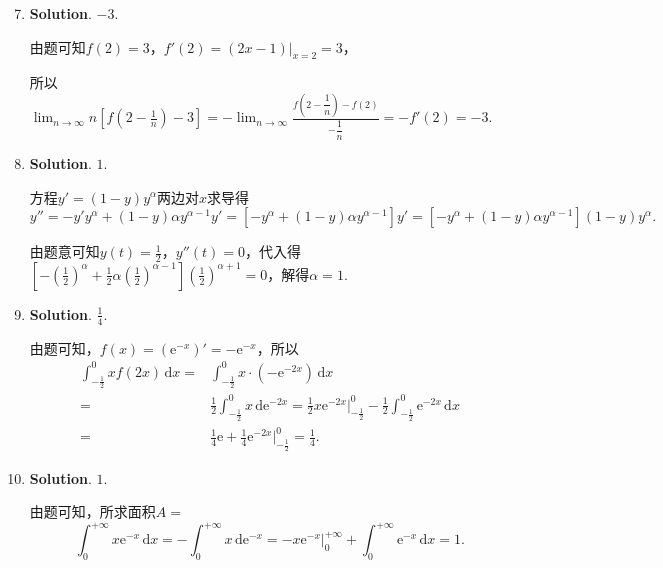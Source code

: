 \documentclass[../Main.tex]{subfiles}
\begin{document}
\begin{enumerate}
    \setcounter{enumi}{6}
    \item \textbf{Solution}. $-3$.

          由题可知$f(2)=3$，$f'(2)=(2x-1)\bigg|_{x=2}=3$，

          所以$\lim_{n\to\infty}n\left[f\left(2-\frac{1}{n}\right)-3\right] = -\lim_{n\to\infty}
              \frac{f\left(2-\dfrac{1}{n}\right)-f(2)}{-\dfrac{1}{n}}= -f'(2) = -3$.

    \item \textbf{Solution}. $1$.

          方程$y'=(1-y)y^{\alpha}$两边对$x$求导得
          \[
              y''=-y'y^{\alpha}+(1-y)\alpha y^{\alpha-1}y'=\left[-y^{\alpha}+(1-y)\alpha
                  y^{\alpha-1}\right]y'=\left[-y^{\alpha}+(1-y)\alpha y^{\alpha-1}\right](1
              -y)y^{\alpha}.
          \]

          由题意可知$y(t)=\frac{1}{2}$，$y''(t)=0$，代入得$\left[-\left(\frac{1}{2}\right
                  )^{\alpha}+\frac{1}{2}\alpha \left(\frac{1}{2}\right)^{\alpha-1}\right]\left
              (\frac{1}{2}\right)^{\alpha+1}=0$，解得$\alpha=1$.

    \item \textbf{Solution}. $\frac{1}{4}$.

          由题可知，$f(x)=\left(\mathrm{e}^{-x}\right)'=-\mathrm{e}^{-x}$，所以
          \[
              \begin{aligned}
                  \int_{-\frac{1}{2}}^{0}xf(2x)\,\mathrm{d}x = & \int_{-\frac{1}{2}}^{0}x\cdot\left(-\mathrm{e}^{-2x}\right)\,\mathrm{d}x                                                                                                               \\
                  =                                            & \frac{1}{2}\int_{-\frac{1}{2}}^{0}x\,\mathrm{d}\mathrm{e}^{-2x}= \frac{1}{2}x\mathrm{e}^{-2x}\bigg|_{-\frac{1}{2}}^{0}-\frac{1}{2}\int_{-\frac{1}{2}}^{0}\mathrm{e}^{-2x}\,\mathrm{d}x \\
                  =                                            & \frac{1}{4}\mathrm{e}+\frac{1}{4}\mathrm{e}^{-2x}\bigg|_{-\frac{1}{2}}^{0}= \frac{1}{4}.
              \end{aligned}
          \]

    \item \textbf{Solution}. $1$.

          由题可知，所求面积$A=$
          \[
              \int_{0}^{+\infty}x\mathrm{e}^{-x}\,\mathrm{d}x = -\int_{0}^{+\infty}x\,\mathrm{d}
              \mathrm{e}^{-x}= -x\mathrm{e}^{-x}\bigg|_{0}^{+\infty}+\int_{0}^{+\infty}
              \mathrm{e}^{-x}\,\mathrm{d}x = 1.
          \]
\end{enumerate}
\end{document}
